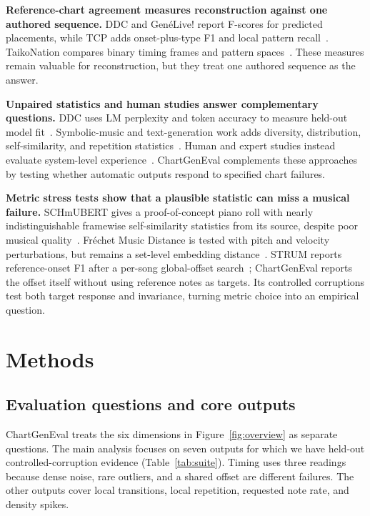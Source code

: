 \documentclass[10pt,twocolumn]{article}
\newcommand{\figref}[1]{Figure~\ref{#1}}
\newcommand{\tabref}[1]{Table~\ref{#1}}
\begin{document}
\textbf{Reference-chart agreement measures reconstruction against one
authored sequence.} DDC and Gen\'eLive! report F-scores
for predicted placements, while TCP adds onset-plus-type F1 and local pattern
recall~\cite{donahue2017ddc,takada2023genelive,hanzen2025tcp}.
TaikoNation compares binary timing frames and pattern
spaces~\cite{halina2021taikonation}. These measures remain valuable for
reconstruction, but they treat one authored sequence as the answer.

\textbf{Unpaired statistics and human studies answer complementary
questions.} DDC uses LM perplexity
and token accuracy to measure held-out model fit~\cite{donahue2017ddc}.
Symbolic-music and text-generation work adds diversity, distribution,
self-similarity, and repetition statistics~\cite{li2016diversity,
zhu2018texygen,yang2020evaluation,dong2020muspy,wu2020jazz}. Human and expert
studies instead evaluate system-level experience~\cite{gover2022mute,
takada2023genelive,wang2024mania}. ChartGenEval complements these approaches
by testing whether automatic outputs respond to specified chart failures.

\textbf{Metric stress tests show that a plausible statistic can miss a
musical failure.} SCHmUBERT gives a proof-of-concept piano roll with nearly
indistinguishable framewise self-similarity statistics from its source,
despite poor musical quality~\cite{plasser2023schmubert}. Fr\'echet Music Distance is tested with
pitch and velocity perturbations, but remains a set-level embedding
distance~\cite{retkowski2025fmd}. STRUM reports reference-onset F1 after
a per-song global-offset search~\cite{opria2026strum}; ChartGenEval
reports the offset itself without using reference notes as targets. Its
controlled corruptions test both target response and invariance, turning
metric choice into an empirical question.

\section{Methods}\label{sec:methods}

\subsection{Evaluation questions and core outputs}\label{sec:suite}

ChartGenEval treats the six dimensions in \figref{fig:overview} as separate
questions. The main analysis focuses on seven outputs for which we have
held-out controlled-corruption evidence (\tabref{tab:suite}). Timing uses
three readings because dense noise, rare outliers, and a shared offset are
different failures. The other outputs cover local transitions, local
repetition, requested note rate, and density spikes.
\end{document}
